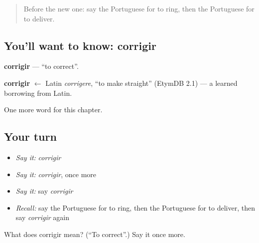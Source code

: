 \label{lesson:PT-C207-corrigir}



\begin{quote}
Before the new one: say the Portuguese for to ring, then the Portuguese for to deliver.
\end{quote}

\subsection*{You'll want to know: corrigir}
\textbf{corrigir} — \textquotedblleft{}to correct\textquotedblright{}.

\begin{cousinweb}
\textbf{corrigir} $\leftarrow$ Latin \emph{corrigere}, \textquotedblleft{}to make straight\textquotedblright{} (EtymDB 2.1) — a learned borrowing from Latin.
\end{cousinweb}

\begin{grammarlens}[title={What you've built}]
One more word for this chapter.
\end{grammarlens}

\subsection*{Your turn}
\begin{itemize}
\raggedright
  \item \emph{Say it:} \emph{corrigir}
  \item \emph{Say it:} \emph{corrigir}, once more
  \item \emph{Say it:} say \emph{corrigir}
  \item \emph{Recall:} say the Portuguese for to ring, then the Portuguese for to deliver, then say \emph{corrigir} again
\end{itemize}

\begin{tcolorbox}[breakable,colback=teal!4,colframe=teal!35!black,title={Before you move on}]
What does corrigir mean? (\textquotedblleft{}To correct\textquotedblright{}.) Say it once more.
\end{tcolorbox}
